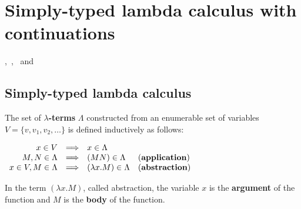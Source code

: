 \section{Simply-typed lambda calculus with continuations} \label{tex:math_prelim}


\cite{Church:1940:A-formulation-of-the-simple-theory-of-types},~\cite{Barendregt:1981:The-Lambda-Calculus:-Its-Syntax-and-Semantics},~\cite{Barendregt:1992:Lambda-Calculi-with-Types} and~\cite{HindleySeldin:2008:Lambda-Calculus-and-Combinators-an-Introduction}


\subsection{Simply-typed lambda calculus} \label{sec:STLC}

\begin{definition} The set of \textbf{$\lambda$-terms} $\Lambda$ constructed from an enumerable set of variables $V = \{ v, v_1 ,v_2, \dots\}$ is defined inductively as follows:
\begin{center}
$
\begin{array}{rcll}
x \in V & \Longrightarrow & x \in \Lambda &\\
M,N \in \Lambda &  \Longrightarrow & (MN) \in \Lambda & \text{(\textbf{application})}\\ 
 x \in V, M \in \Lambda&  \Longrightarrow  & (\lambda x.M) \in \Lambda & \text{(\textbf{abstraction})}
\end{array} 
$
\end{center}
\end{definition}

In the term $ (\lambda x.M)$, called abstraction, the variable $x$ is the \textbf{argument} of the function and $M$ is the \textbf{body} of the function. %

